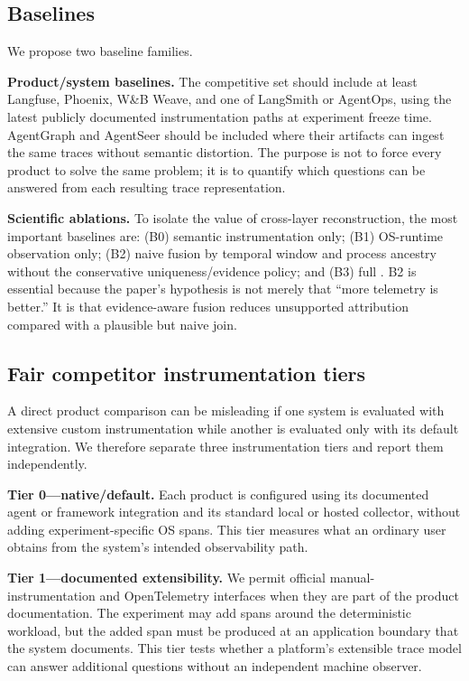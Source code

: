 \subsection{Baselines}
We propose two baseline families.

\textbf{Product/system baselines.} The competitive set should include at least Langfuse, Phoenix, W\&B Weave, and one of LangSmith or AgentOps, using the latest publicly documented instrumentation paths at experiment freeze time. AgentGraph and AgentSeer should be included where their artifacts can ingest the same traces without semantic distortion. The purpose is not to force every product to solve the same problem; it is to quantify which questions can be answered from each resulting trace representation.

\textbf{Scientific ablations.} To isolate the value of cross-layer reconstruction, the most important baselines are: (B0) semantic instrumentation only; (B1) OS-runtime observation only; (B2) naive fusion by temporal window and process ancestry without the conservative uniqueness/evidence policy; and (B3) full \system. B2 is essential because the paper's hypothesis is not merely that ``more telemetry is better.'' It is that evidence-aware fusion reduces unsupported attribution compared with a plausible but naive join.

\subsection{Fair competitor instrumentation tiers}
A direct product comparison can be misleading if one system is evaluated with extensive custom instrumentation while another is evaluated only with its default integration. We therefore separate three instrumentation tiers and report them independently.

\textbf{Tier 0---native/default.} Each product is configured using its documented agent or framework integration and its standard local or hosted collector, without adding experiment-specific OS spans. This tier measures what an ordinary user obtains from the system's intended observability path.

\textbf{Tier 1---documented extensibility.} We permit official manual-instrumentation and OpenTelemetry interfaces when they are part of the product documentation. The experiment may add spans around the deterministic workload, but the added span must be produced at an application boundary that the system documents. This tier tests whether a platform's extensible trace model can answer additional questions without an independent machine observer.

